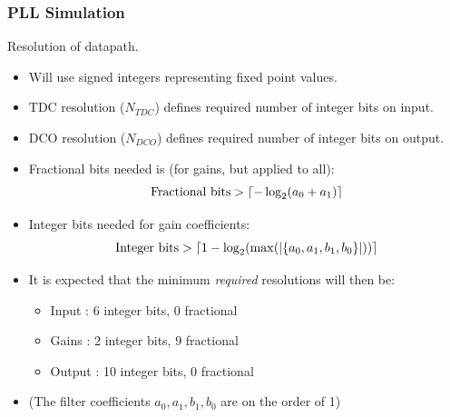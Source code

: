 \documentclass[t, screen, aspectratio=43]{beamer}
\begin{document}
\begin{frame}
	\frametitle{PLL Simulation}
	\begin{block}{Resolution of datapath.}
		\begin{itemize}
			\scriptsize
			\item Will use signed integers representing fixed point values.
			\item TDC resolution ($N_{TDC}$) defines required number of integer bits on input.
			\item DCO resolution ($N_{DCO}$) defines required number of integer bits on output.
			\item Fractional bits needed is (for gains, but applied to all):
			\begin{equation}
				\textnormal{Fractional bits} > \lceil -\log_2(a_0+a_1) \rceil
			\end{equation}
			\item Integer bits needed for gain coefficients:
			\begin{equation}
				\textnormal{Integer bits} > \lceil1 -\log_2(\max(|\{a_0, a_1, b_1, b_0\}|)) \rceil
			\end{equation}
			\item It is expected that the minimum \textit{required} resolutions will then be:
			\begin{itemize}
				\scriptsize
				\item Input  : 6 integer bits, 0 fractional
				\item Gains  : 2 integer bits, 9 fractional
				\item Output : 10 integer bits, 0 fractional
			\end{itemize}
			\item (The filter coefficients $a_0, a_1, b_1, b_0$ are on the order of 1)
		\end{itemize} 	
	\end{block}
\end{frame}
\end{document}
